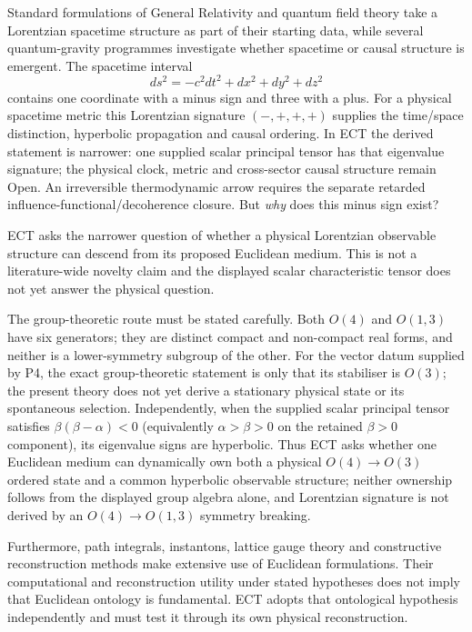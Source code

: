 \documentclass[11pt,a4paper]{article}
\begin{document}
Standard formulations of General Relativity and quantum field theory take a
Lorentzian spacetime structure as part of their starting data, while several
quantum-gravity programmes investigate whether spacetime or causal structure
is emergent.  The spacetime interval
\begin{equation}
  ds^2 = -c^2 dt^2 + dx^2 + dy^2 + dz^2
  \label{eq:pop_interval}
\end{equation}
contains one coordinate with a minus sign and three with a plus. For a physical spacetime metric this Lorentzian signature $(-,+,+,+)$ supplies the time/space distinction, hyperbolic propagation and causal ordering.  In ECT the derived statement is narrower: one supplied scalar principal tensor has that eigenvalue signature; the physical clock, metric and cross-sector causal structure remain Open.  An irreversible thermodynamic arrow requires the separate retarded influence-functional/decoherence closure. But \emph{why} does this minus sign exist?

ECT asks the narrower question of whether a physical Lorentzian observable
structure can descend from its proposed Euclidean medium.  This is not a
literature-wide novelty claim and the displayed scalar characteristic tensor
does not yet answer the physical question.

The group-theoretic route must be stated carefully.  Both $O(4)$ and $O(1,3)$ have six generators; they are distinct compact and non-compact real forms, and neither is a lower-symmetry subgroup of the other.  For the vector datum supplied by P4, the exact group-theoretic statement is only that its stabiliser is $O(3)$; the present theory does not yet derive a stationary physical state or its spontaneous selection.  Independently, when the supplied scalar principal tensor satisfies $\beta(\beta-\alpha)<0$ (equivalently $\alpha>\beta>0$ on the retained $\beta>0$ component), its eigenvalue signs are hyperbolic.  Thus ECT asks whether one Euclidean medium can dynamically own both a physical $O(4)\to O(3)$ ordered state and a common hyperbolic observable structure; neither ownership follows from the displayed group algebra alone, and Lorentzian signature is not derived by an $O(4)\to O(1,3)$ symmetry breaking.

Furthermore, path integrals, instantons, lattice gauge theory and
constructive reconstruction methods make extensive use of Euclidean
formulations.  Their computational and reconstruction utility under stated
hypotheses does not imply that Euclidean ontology is fundamental.  ECT adopts
that ontological hypothesis independently and must test it through its own
physical reconstruction.
\end{document}
